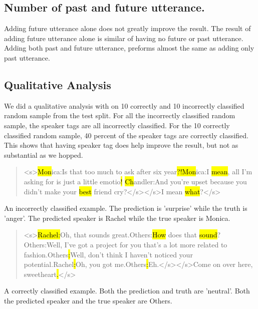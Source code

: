 \documentclass[11pt]{article}
\begin{document}
\subsection{Number of past and future utterance.}

Adding future utterance alone does not greatly improve the result. The result of adding future utterance alone is similar of having no future or past utterance. Adding both past and future utterance, preforms almost the same as adding only past utterance. 

\subsection{Qualitative Analysis}

We did a qualitative analysis with on 10 correctly and 10 incorrectly classified random sample from the test split. For all the incorrectly classified random sample, the speaker tags are all incorrectly classified. For the 10 correctly classified random sample, 40 percent of the speaker tags are correctly classified. This shows that having speaker tag does help improve the result, but not as substantial as we hopped. 

\begin{quote}

<s>\hl{Mon}ica:Is that too much to ask after six year\hl{?!}\hl{Mon}ica:I \hl{mean}, all I’m asking for is just a little emotio\hl{!} \hl{Ch}andler:And you’re upset because you didn’t make your \hl{best} friend cry?</s></s>I mean \hl{what}?</s>

\end{quote}

An incorrectly classified example. The prediction is 'surprise' while the truth is 'anger'. The predicted speaker is Rachel while the true speaker is Monica.

\begin{quote}

<s>\hl{Rachel}\hl{:}Oh, that sounds great.Others:\hl{How} does that \hl{sound}?Others:Well, I’ve got a project for you that’s a lot more related to fashion.Others\hl{:}Well, don’t think I haven’t noticed your potential.Rachel\hl{:}Oh, you got me.Others\hl{:}Eh.</s></s>Come on over here, sweetheart\hl{.}</s>

\end{quote}

A correctly classified example. Both the prediction and truth are 'neutral'. Both the predicted speaker and the true speaker are Others. \\
\end{document}
